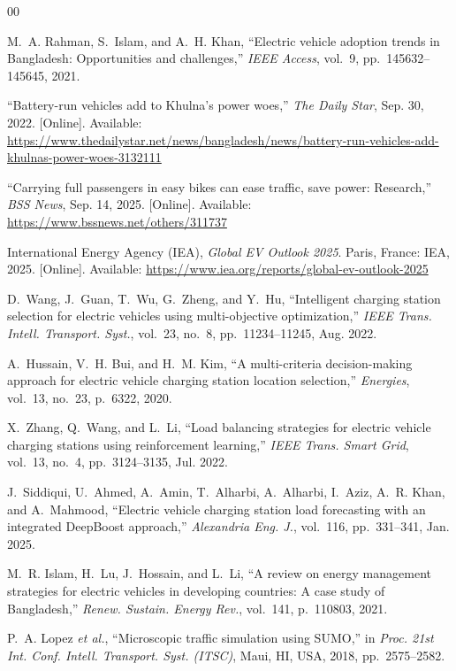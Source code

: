 \documentclass[conference]{IEEEtran}
\begin{document}
\begin{thebibliography}{00}

M.~A. Rahman, S.~Islam, and A.~H. Khan, ``Electric vehicle adoption trends in Bangladesh: Opportunities and challenges,'' \textit{IEEE Access}, vol.~9, pp.~145632--145645, 2021.

``Battery-run vehicles add to Khulna's power woes,'' \textit{The Daily Star}, Sep. 30, 2022. [Online]. Available: \url{https://www.thedailystar.net/news/bangladesh/news/battery-run-vehicles-add-khulnas-power-woes-3132111}

``Carrying full passengers in easy bikes can ease traffic, save power: Research,'' \textit{BSS News}, Sep. 14, 2025. [Online]. Available: \url{https://www.bssnews.net/others/311737}

International Energy Agency (IEA), \textit{Global EV Outlook 2025}. Paris, France: IEA, 2025. [Online]. Available: \url{https://www.iea.org/reports/global-ev-outlook-2025}

D.~Wang, J.~Guan, T.~Wu, G.~Zheng, and Y.~Hu, ``Intelligent charging station selection for electric vehicles using multi-objective optimization,'' \textit{IEEE Trans. Intell. Transport. Syst.}, vol.~23, no.~8, pp.~11234--11245, Aug. 2022.

A.~Hussain, V.~H. Bui, and H.~M. Kim, ``A multi-criteria decision-making approach for electric vehicle charging station location selection,'' \textit{Energies}, vol.~13, no.~23, p.~6322, 2020.

X.~Zhang, Q.~Wang, and L.~Li, ``Load balancing strategies for electric vehicle charging stations using reinforcement learning,'' \textit{IEEE Trans. Smart Grid}, vol.~13, no.~4, pp.~3124--3135, Jul. 2022.

J.~Siddiqui, U.~Ahmed, A.~Amin, T.~Alharbi, A.~Alharbi, I.~Aziz, A.~R. Khan, and A.~Mahmood, ``Electric vehicle charging station load forecasting with an integrated DeepBoost approach,'' \textit{Alexandria Eng. J.}, vol.~116, pp.~331--341, Jan. 2025.

M.~R. Islam, H.~Lu, J.~Hossain, and L.~Li, ``A review on energy management strategies for electric vehicles in developing countries: A case study of Bangladesh,'' \textit{Renew. Sustain. Energy Rev.}, vol.~141, p.~110803, 2021.

P.~A. Lopez \textit{et al.}, ``Microscopic traffic simulation using SUMO,'' in \textit{Proc. 21st Int. Conf. Intell. Transport. Syst. (ITSC)}, Maui, HI, USA, 2018, pp.~2575--2582.


\end{thebibliography}
\end{document}
